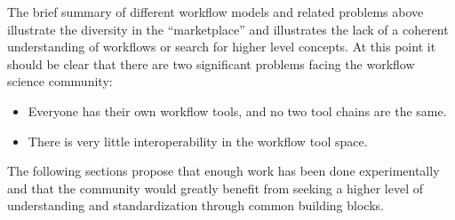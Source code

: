 The brief summary of different workflow models and related problems above illustrate the
diversity in the ``marketplace'' and illustrates the lack of a coherent understanding of 
workflows or search for higher level concepts. At this point it should be clear that there are 
two significant problems facing the workflow science community:
\begin{itemize}
  \item Everyone has their own workflow tools, and no two tool chains are the same.
  \item There is very little interoperability in the workflow tool space.
\end{itemize} The following sections propose that enough work has
been done experimentally and that the community would greatly benefit from seeking a
higher level of understanding and standardization through common building blocks.
